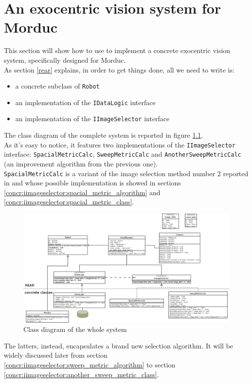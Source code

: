 \setcounter{figure}{0}
\setcounter{table}{0}
\setcounter{lstlisting}{0}

\chapter{An exocentric vision system for Morduc}
\label{concr}
\minitoc

This section will show how to use \framework{} to implement a 
concrete exocentric vision system, specifically designed for 
Morduc.
\\
As section \ref{rear} explains, in order to get things 
done, all we need to write is:

\begin{itemize}
\item a concrete subclass of \texttt{Robot}
\item an implementation of the \texttt{IDataLogic} interface
\item an implementation of the \texttt{IImageSelector} interface
\end{itemize}

The class diagram of the complete system is reported in figure 
\ref{fig:class_diagram_complete}. 
\\
As it's easy to notice, it features two implementations 
of the \texttt{IImageSelector} interface: \texttt{SpacialMetricCalc},
\texttt{SweepMetricCalc} and \texttt{AnotherSweepMetricCalc}
(an improvement algorithm from the previous one).
\\
\texttt{SpacialMetricCalc} is a variant 
of the image selection method number 2 reported in \cite{sugimoto} and 
whose possible implementation is showed in sections
\ref{concr:iimageselector:spacial_metric_algorithm} and
\ref{concr:iimageselector:spacial_metric_class}.

\begin{figure}[!h]
  \begin{center}
    \includegraphics[width=\textwidth]{img/class_diagram.png} 
    \caption{Class diagram of the whole system}
    \label{fig:class_diagram_complete}
  \end{center}
\end{figure}

The latters, instead, encapsulates a brand new selection algorithm. 
It will be widely discussed later from section
\ref{concr:iimageselector:sweep_metric_algorithm} to section
\ref{concr:iimageselector:another_sweep_metric_class}.

\clearpage

\clearpage

\clearpage

